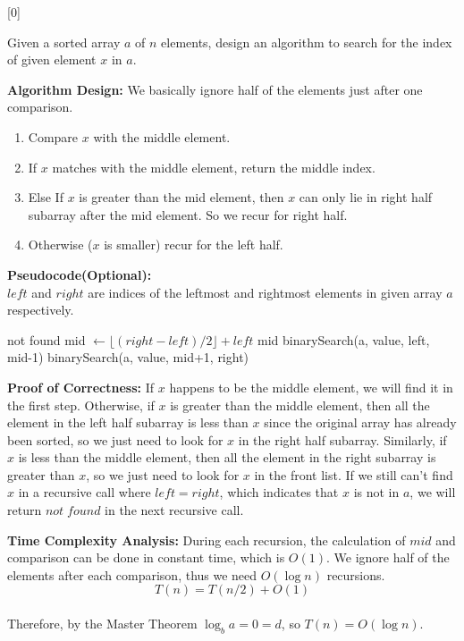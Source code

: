 [0]

Given a sorted array $a$ of $n$ elements, design an algorithm to search for the index of given element $x$ in $a$.

\begin{solution}


\textbf{Algorithm Design:} We basically ignore half of the elements just after one comparison.
\begin{enumerate}
	\item Compare $x$ with the middle element.
	\item If $x$ matches with the middle element, return the middle index.
	\item Else If $x$ is greater than the mid element, then $x$ can only lie in right half subarray after the mid element. So we recur for right half.
	\item Otherwise ($x$ is smaller) recur for the left half.
\end{enumerate}

\textbf{Pseudocode(Optional):}\\
$left$ and $right$ are indices of the leftmost and rightmost elements in given array $a$ respectively.
\begin{algorithm}[H]
    \color{blue}
	\begin{algorithmic}[1]
		\State \Return not found
		\EndIf
		\State mid $\gets \lfloor (right-left)/2 \rfloor + left$
		\State \Return mid
		\EndIf
		\State \Return binarySearch(a, value, left, mid-1)
		\Else
		\State \Return binarySearch(a, value, mid+1, right) 
		\EndIf   		
		\EndFunction
	\end{algorithmic}
\end{algorithm}

\textbf{Proof of Correctness:}
If $x$ happens to be the middle element, we will find it in the first step. Otherwise, if $x$ is greater than the middle element, then all the element in the left half subarray is less than $x$ since the original array has already been sorted, so we just need to look for $x$ in the right half subarray. Similarly, if $x$ is less than the middle element, then all the element in the right subarray is greater than $x$, so we just need to look for $x$ in the front list. If we still can't find $x$ in a recursive call where $left = right$, which indicates that $x$ is not in $a$, we will return $not\; found$ in the next recursive call.

\textbf{Time Complexity Analysis:}
During each recursion, the calculation of $mid$ and comparison can be done in constant time, which is $O(1)$. We ignore half of the elements after each comparison, thus we need $O(\log n)$ recursions.
$$T(n) = T(n/2)+O(1)$$\\
Therefore, by the Master Theorem $\log_{b}{a}=0=d$, so $T(n) = O(\log n)$.

\end{solution}